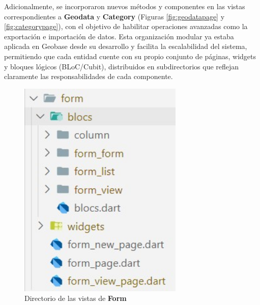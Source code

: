 \documentclass{article}
\begin{document}
Adicionalmente, se incorporaron nuevos métodos y componentes en las vistas correspondientes a \textbf{Geodata} y \textbf{Category} (Figuras \ref{fig:geodatapage} y \ref{fig:categorypage}), con el objetivo de habilitar operaciones avanzadas como la exportación e importación de datos. Esta organización modular ya estaba aplicada en Geobase desde su desarrollo y facilita la escalabilidad del sistema, permitiendo que cada entidad cuente con su propio conjunto de páginas, widgets y bloques lógicos (BLoC/Cubit), distribuidos en subdirectorios que reflejan claramente las responsabilidades de cada componente.

\begin{figure}[H]
  \centering
  \begin{minipage}[b]{0.32\textwidth}
    \centering
    \includegraphics[width=0.7\textwidth]{images/form_page.jpg}
    \caption{Directorio de las vistas de \textbf{Form}}
    \label{fig:formpage}
  \end{minipage}
  \hspace{0.02\textwidth}
  \begin{minipage}[b]{0.3\textwidth}
    \centering

\end{minipage}
\end{figure}
\end{document}
